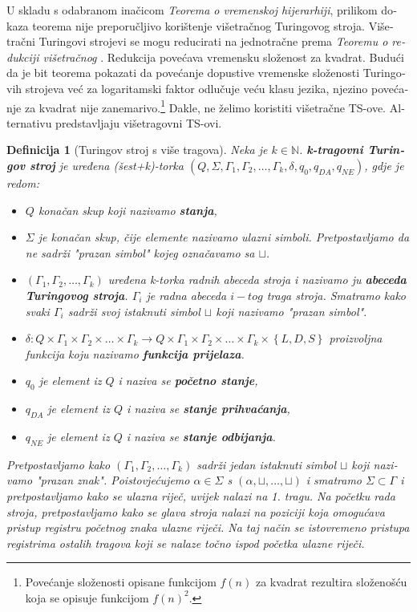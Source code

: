 \documentclass[12pt]{rectors}
\newtheorem{definition}{Definicija}[section]
\begin{document}
\begin{otherlanguage}{croatian}
U skladu s odabranom inačicom \textit{Teorema o vremenskoj hijerarhiji},
prilikom dokaza teorema nije preporučljivo korištenje višetračnog Turingovog stroja.
Višetračni Turingovi strojevi se mogu reducirati na jednotračne prema \textit{Teoremu o redukciji višetračnog} \cite{vukovic2016}. Redukcija povećava vremensku složenost za kvadrat.
Budući da je bit teorema pokazati da povećanje dopustive vremenske složenosti Turingovih strojeva već za logaritamski faktor odlučuje veću klasu jezika, njezino povećanje za kvadrat nije zanemarivo.\footnote{Povećanje složenosti opisane funkcijom $f(n)$ za kvadrat rezultira složenošću koja se opisuje funkcijom $f(n)^2$.}
Dakle, ne želimo koristiti višetračne TS-ove. Alternativu predstavljaju višetragovni TS-ovi. 
\begin{definition}[Turingov stroj s više tragova]
Neka je $k\in \mathbb{N}$.
\textbf{k-tragovni Turingov stroj} je uređena (šest+k)-torka $\left ( Q,\Sigma , \Gamma_1, \Gamma_2, \hdots, \Gamma_k ,\delta, q_0, q_{DA} , q_{NE}\right )$, gdje je redom:
\begin{itemize}
    \item $Q$ konačan skup koji nazivamo \textbf{stanja},
    \item $\Sigma$ je konačan skup, čije elemente nazivamo ulazni simboli. Pretpostavljamo da ne sadrži "prazan simbol" kojeg označavamo sa $\sqcup$.
    \item $\left ( \Gamma_1, \Gamma_2, \hdots, \Gamma_k \right )$  uređena k-torka radnih abeceda stroja i nazivamo ju \textbf{abeceda Turingovog stroja}. 
    $\Gamma_i$ je radna abeceda $i-tog$ traga stroja.
    Smatramo kako svaki $\Gamma_i$ sadrži svoj istaknuti simbol $\sqcup$ koji nazivamo "prazan simbol".
    \item $\delta : Q \times \Gamma_1 \times \Gamma_2 \times \hdots \times \Gamma_k \to Q \times \Gamma_1 \times \Gamma_2 \times \hdots \times \Gamma_k \times \left \{ L,D,S \right\} $ proizvoljna funkcija koju nazivamo \textbf{funkcija prijelaza}.
\item $q_0$ je element iz $Q$ i naziva se \textbf{početno stanje},
\item $q_{DA}$ je element iz $Q$ i naziva se \textbf{stanje prihvaćanja},
\item $q_{NE}$ je element iz $Q$ i naziva se \textbf{stanje odbijanja}.
\end{itemize}


Pretpostavljamo kako  $\left ( \Gamma_1, \Gamma_2, \hdots, \Gamma_k \right ) $ sadrži jedan istaknuti simbol $\sqcup$ koji nazivamo "prazan znak".
Poistovjećujemo $\alpha \in \Sigma$ s $\left ( \alpha, \sqcup, \hdots, \sqcup \right )$ i smatramo $\Sigma \subset \Gamma$ i pretpostavljamo kako se ulazna riječ, uvijek nalazi na 1. tragu.
Na početku rada stroja, pretpostavljamo kako se glava stroja nalazi na poziciji koja omogućava pristup registru početnog znaka ulazne riječi. Na taj način se istovremeno pristupa registrima ostalih tragova koji se nalaze točno ispod početka ulazne riječi.
\end{definition}


\end{otherlanguage}
\end{document}
